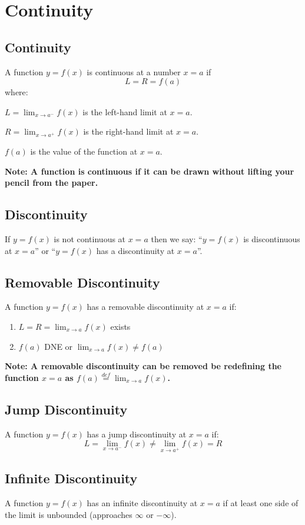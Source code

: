 \section{Continuity}
\subsection{Continuity}
	A function $y=f(x)$ is continuous at a number $x=a$ if \[L = R = f(a)\]
	where:

	$\displaystyle L = \lim_{x \to a^-} f(x)$ is the left-hand limit at $x=a$.

	$\displaystyle R = \lim_{x \to a^+} f(x)$ is the right-hand limit at $x=a$.

	$f(a)$ is the value of the function at $x=a$.
	
	\textbf{Note: A function is continuous if it can be drawn without lifting your pencil from the paper.}
\subsection{Discontinuity}
	If $y=f(x)$ is not continuous at $x=a$ then we say:
	``$y=f(x)$ is discontinuous at $x=a$''
	or
	``$y=f(x)$ has a discontinuity at $x=a$''.
\subsection{Removable Discontinuity}
	A function $y=f(x)$ has a removable discontinuity at $x=a$ if:
	\begin{enumerate}
		\item $\displaystyle L=R=\lim_{x \to a} f(x)$ exists
		\item $f(a)$ DNE or $\displaystyle \lim_{x \to a}f(x) \neq f(a)$
	\end{enumerate}
	\textbf{Note: A removable discontinuity can be removed be redefining the function $x=a$ as $\displaystyle f(a) \stackrel{def}{=} \lim_{x \to a} f(x)$.}
\subsection{Jump Discontinuity}
	A function $y=f(x)$ has a jump discontinuity at $x=a$ if:
	\[L = \lim_{x \to a^-} f(x) \neq \lim_{x \to a^+} f(x) = R\]
\subsection{Infinite Discontinuity}
	A function $y=f(x)$ has an infinite discontinuity at $x=a$ if at least one side of the limit is unbounded (approaches $\infty$ or $-\infty$).
